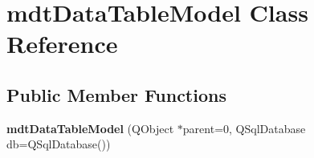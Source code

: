 \hypertarget{classmdt_data_table_model}{
\section{mdtDataTableModel Class Reference}
\label{classmdt_data_table_model}
}
\subsection*{Public Member Functions}
\begin{DoxyCompactItemize}
\item 
\hypertarget{classmdt_data_table_model_abb59a97c41fea89a44c7b728774ef2ee}{
{\bfseries mdtDataTableModel} (QObject $\ast$parent=0, QSqlDatabase db=QSqlDatabase())}
\label{classmdt_data_table_model_abb59a97c41fea89a44c7b728774ef2ee}


\end{DoxyCompactItemize}
